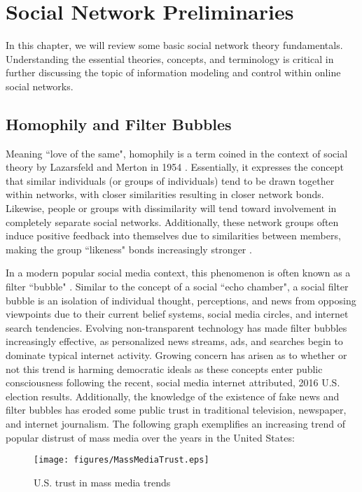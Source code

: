 \chapter{Social Network Preliminaries} \label{chapter_preliminaries}
In this chapter, we will review some basic social network theory fundamentals. Understanding the essential theories, concepts, and terminology is critical in further discussing the topic of information modeling and control within online social networks. 

\section{Homophily and Filter Bubbles}
Meaning ``love of the same", homophily is a term coined in the context of social theory by Lazarsfeld and Merton in 1954 \cite{lazarsfeld1954friendship}. Essentially, it expresses the concept that similar individuals (or groups of individuals) tend to be drawn together within networks, with closer similarities resulting in closer network bonds. Likewise, people or groups with dissimilarity will tend toward involvement in completely separate social networks. Additionally, these network groups often induce positive feedback into themselves due to similarities between members, making the group ``likeness" bonds increasingly stronger \cite{kadushin2012understanding}. 

In a modern popular social media context, this phenomenon is often known as a filter ``bubble" \cite{bozdag2013bias}. Similar to the concept of a social ``echo chamber", a social filter bubble is an isolation of individual thought, perceptions, and news from opposing viewpoints due to their current belief systems, social media circles, and internet search tendencies. Evolving non-transparent technology has made filter bubbles increasingly effective, as personalized news streams, ads, and searches begin to dominate typical internet activity. Growing concern has arisen as to whether or not this trend is harming democratic ideals as these concepts enter public consciousness \cite{difranzo2017filter} following the recent, social media internet attributed, 2016 U.S. election results. Additionally, the knowledge of the existence of fake news and filter bubbles has eroded some public trust in traditional television, newspaper, and internet journalism. The following graph exemplifies an increasing trend of popular distrust of mass media over the years in the United States:

\begin{figure}[!htbp] \centering
  \texttt{[image: figures/MassMediaTrust.eps]}
  \caption{U.S. trust in mass media trends \cite{swift:2016}}
  \label{fig:MassMediaTrust}
\end{figure}

